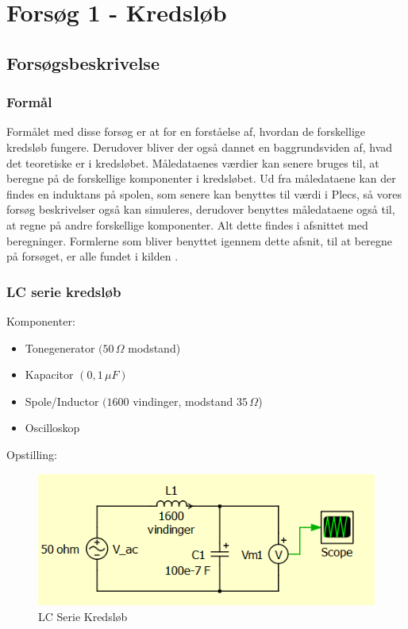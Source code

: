 \section{Forsøg 1 - Kredsløb}

\subsection{Forsøgsbeskrivelse}

\subsubsection{Formål}
Formålet med disse forsøg er at for en forståelse af, hvordan de forskellige kredsløb fungere. Derudover bliver der også dannet en baggrundsviden af, hvad det teoretiske er i kredsløbet. Måledataenes værdier kan senere bruges til, at beregne på de forskellige komponenter i kredsløbet. Ud fra måledataene kan der findes en induktans på spolen, som senere kan benyttes til værdi i Plecs, så vores forsøg beskrivelser også kan simuleres, derudover benyttes måledataene også til, at regne på andre forskellige komponenter. Alt dette findes i afsnittet med beregninger. Formlerne som bliver benyttet igennem dette afsnit, til at beregne på forsøget, er alle fundet i kilden \cite{fysikbog}.

\subsubsection{LC serie kredsløb}

Komponenter:

\begin{itemize}
\item Tonegenerator $(50\, \Omega$ modstand)
\item Kapacitor $( 0,1\, \mu F)$
\item Spole/Inductor $(1600$ vindinger, modstand $35 \, \Omega$)
\item Oscilloskop
\end{itemize}

Opstilling:

\begin{figure}[H]
\centering
\includegraphics[scale=1]{Vildledning/Schematics/Kredslb/LC_Serie}
\caption{LC Serie Kredsløb}
\label{lcserie}
\end{figure}

